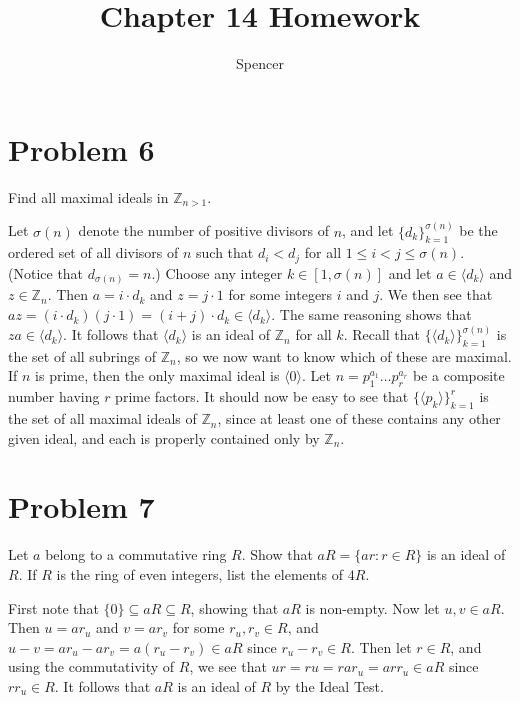 \documentclass{article}
\title{Chapter 14 Homework}
\author{Spencer}
\begin{document}
\maketitle

\newcommand{\Z}{\mathbb{Z}}
\newcommand{\R}{\mathbb{R}}
\newcommand{\N}{\mathbb{N}}
\newcommand{\lcm}{\mbox{lcm}}
\newcommand{\ann}{\mbox{Ann}}

\section*{Problem 6}

Find all maximal ideals in $\Z_{n>1}$.

Let $\sigma(n)$ denote the number of positive divisors of $n$,
and let $\{d_k\}_{k=1}^{\sigma(n)}$ be the ordered set of all
divisors of $n$ such that $d_i<d_j$ for all $1\leq i<j\leq\sigma(n)$.
(Notice that $d_{\sigma(n)}=n$.)
Choose any integer $k\in[1,\sigma(n)]$ and let $a\in\langle d_k\rangle$ and $z\in\Z_n$.
Then $a=i\cdot d_k$ and $z=j\cdot 1$ for some integers $i$ and $j$.
We then see that $az=(i\cdot d_k)(j\cdot 1)=(i+j)\cdot d_k\in\langle d_k\rangle$.
The same reasoning shows that $za\in\langle d_k\rangle$.
It follows that $\langle d_k\rangle$ is an ideal of $\Z_n$ for all $k$.
Recall that $\{\langle d_k\rangle\}_{k=1}^{\sigma(n)}$ is the set of all
subrings of $\Z_n$, so we now want to know which of these are maximal.
If $n$ is prime, then the only maximal ideal is $\langle 0\rangle$.
Let $n=p_1^{a_1}\dots p_r^{a_r}$ be a composite number having $r$ prime factors.
It should now be easy to see that $\{\langle p_k\rangle\}_{k=1}^r$ is
the set of all maximal ideals of $\Z_n$, since at least
one of these contains any other given
ideal, and each is properly contained only by $\Z_n$.

\section*{Problem 7}

Let $a$ belong to a commutative ring $R$.  Show that $aR=\{ar:r\in R\}$ is
an ideal of $R$.  If $R$ is the ring of even integers, list the elements of $4R$.

First note that $\{0\}\subseteq aR\subseteq R$, showing that $aR$ is non-empty.
Now let $u,v\in aR$.  Then $u=ar_u$ and $v=ar_v$ for some $r_u,r_v\in R$, and
$u-v=ar_u-ar_v=a(r_u-r_v)\in aR$ since $r_u-r_v\in R$.  Then let $r\in R$,
and using the commutativity of $R$, we see that $ur=ru=rar_u=arr_u\in aR$
since $rr_u\in R$.  It follows that $aR$ is an ideal of $R$ by the Ideal Test.
\end{document}
